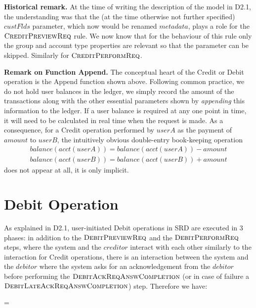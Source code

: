 {\bf Historical remark.} At the time of writing the description of the model in D2.1, the understanding was that the (at the time otherwise not further specified) $custFlds$ parameter, which now would be renamed $metadata$, plays a role for the $\hbox{\sc CreditPreviewReq}$ rule. We now know that for the behaviour of this rule only the group and account type properties are relevant so that the parameter can be skipped. Similarly for $\hbox{\sc CreditPerformReq}$.


{\bf Remark on Function Append.} The conceptual heart of the Credit or Debit operation is the Append function shown above. Following common practice, we do not hold user balances in the ledger, we simply record the amount of the transactions along with the other essential parameters shown by \emph{appending} this information to the ledger. If a user balance is required at any one point in time, it will need to be calculated in real time when the request is made. As a consequence, for a Credit operation performed by $userA$ as the payment of $amount$ to $userB$, the intuitively obvious double-entry book-keeping operation
\begin{align*}
balance(acct(userA)) = balance(acct(userA)) - amount \\
balance(acct(userB)) = balance(acct(userB)) + amount
\end{align*}
does not appear at all, it is only implicit.


\section{Debit Operation} 
\label{sect:debitops}

As explained in D2.1, user-initiated Debit operations in SRD are executed in 3 phases: in addition to the $\hbox{\sc DebitPreviewReq}$ and the $\hbox{\sc DebitPerformReq}$ steps, where the system and the $creditor$ interact with each other similarly to the interaction for Credit operations, there is an interaction between the system and the $debitor$ where the system asks for an acknowledgement from the $debitor$ before performing the $\hbox{\sc DebitAckReqAnswCompletion}$ (or in case of failure a $\hbox{\sc DebitLateAckReqAnswCompletion}$) step. Therefore we have:

\begin{asm}
=\+
    \\
    \\
   \\
\end{asm}

